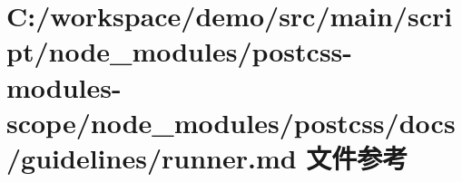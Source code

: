 \hypertarget{postcss-modules-scope_2node__modules_2postcss_2docs_2guidelines_2runner_8md}{}\section{C\+:/workspace/demo/src/main/script/node\+\_\+modules/postcss-\/modules-\/scope/node\+\_\+modules/postcss/docs/guidelines/runner.md 文件参考}
\label{postcss-modules-scope_2node__modules_2postcss_2docs_2guidelines_2runner_8md}
